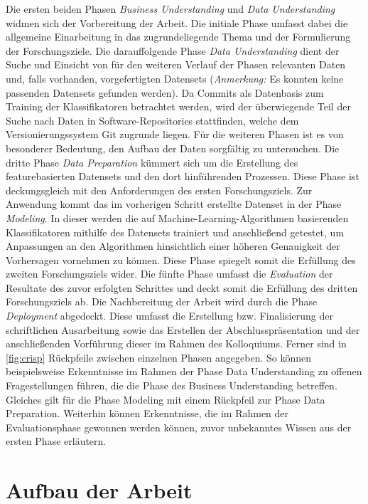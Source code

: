 Die ersten beiden Phasen \emph{Business Understanding} und \emph{Data Understanding} widmen sich der Vorbereitung der Arbeit. Die initiale Phase umfasst dabei die allgemeine Einarbeitung in das zugrundeliegende Thema und der Formulierung der Forschungsziele. Die darauffolgende Phase \emph{Data Understanding} dient der Suche und Einsicht von für den weiteren Verlauf der Phasen relevanten Daten und, falls vorhanden, vorgefertigten Datensets (\textit{Anmerkung:} Es konnten keine passenden Datensets gefunden werden). Da Commits als Datenbasis zum Training der Klassifikatoren betrachtet werden, wird der überwiegende Teil der Suche nach Daten in Software-Repositories stattfinden, welche dem Versionierungssystem Git zugrunde liegen. Für die weiteren Phasen ist es von besonderer Bedeutung, den Aufbau der Daten sorgfältig zu untersuchen. Die dritte Phase \emph{Data Preparation} kümmert sich um die Erstellung des featurebasierten Datensets und den dort hinführenden Prozessen. Diese Phase ist deckungsgleich mit den Anforderungen des ersten Forschungsziels. Zur Anwendung kommt das im vorherigen Schritt erstellte Datenset in der Phase \emph{Modeling}. In dieser werden die auf Machine-Learning-Algorithmen basierenden Klassifikatoren mithilfe des Datensets trainiert und anschließend getestet, um Anpassungen an den Algorithmen hinsichtlich einer höheren Genauigkeit der Vorhersagen vornehmen zu können. Diese Phase spiegelt somit die Erfüllung des zweiten Forschungsziels wider. Die fünfte Phase umfasst die \emph{Evaluation} der Resultate des zuvor erfolgten Schrittes und deckt somit die Erfüllung des dritten Forschungsziels ab. Die Nachbereitung der Arbeit wird durch die Phase \emph{Deployment} abgedeckt. Diese umfasst die Erstellung bzw. Finalisierung der schriftlichen Ausarbeitung sowie das Erstellen der Abschlusspräsentation und der anschließenden Vorführung dieser im Rahmen des Kolloquiums.
Ferner sind in \autoref{fig:crisp} Rückpfeile zwischen einzelnen Phasen angegeben. So können beispielsweise Erkenntnisse im Rahmen der Phase Data Understanding zu offenen Fragestellungen führen, die die Phase des Business Understanding betreffen. Gleiches gilt für die Phase Modeling mit einem Rückpfeil zur Phase Data Preparation. Weiterhin können Erkenntnisse, die im Rahmen der Evaluationsphase gewonnen werden können, zuvor unbekanntes Wissen aus der ersten Phase erläutern.

\section{Aufbau der Arbeit}

